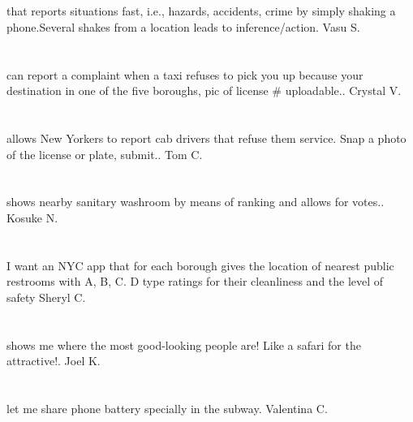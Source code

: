 \section{}that reports situations fast, i.e., hazards, accidents, crime by simply shaking a phone.Several shakes from a location leads to inference/action. Vasu S.
\section{}can report a complaint when a taxi refuses to pick you up because your destination in one of the five boroughs,  pic of license \# uploadable.. Crystal  V.
\section{}allows New Yorkers to report cab drivers that refuse them service. Snap a photo of the license or plate,  submit.. Tom C.
\section{}shows nearby sanitary washroom by means of ranking and allows for votes.. Kosuke N.
\section{} I want an NYC app that for each borough gives the location of nearest public restrooms with A,  B,  C.  D type ratings for their cleanliness and the level of safety     Sheryl C.
\section{}shows me where the most good-looking people are! Like a safari for the attractive!. Joel K.
\section{}let me share phone battery specially in the subway. Valentina C.

